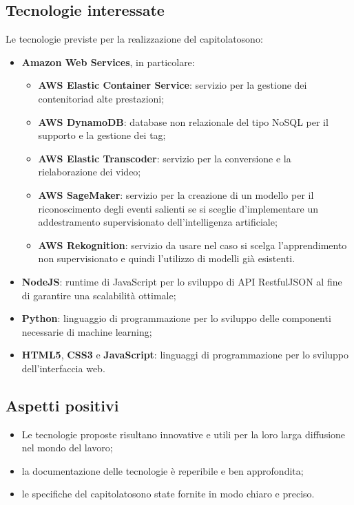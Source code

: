\subsection{Tecnologie interessate}
Le tecnologie previste per la realizzazione del capitolato\glosp sono:
\begin{itemize}
	\item \textbf{Amazon Web Services}\glo, in particolare:
	\begin{itemize}
		\item \textbf{AWS Elastic Container Service}: servizio per la gestione dei contenitori\glosp ad alte prestazioni;
		\item \textbf{AWS DynamoDB}: database non relazionale del tipo NoSQL per il supporto e la gestione dei tag;
		\item \textbf{AWS Elastic Transcoder}: servizio per la conversione e la rielaborazione dei video;
		\item \textbf{AWS SageMaker}: servizio per la creazione di un modello per il riconoscimento degli eventi salienti se si sceglie d'implementare un addestramento supervisionato dell'intelligenza artificiale\glo;
		\item \textbf{AWS Rekognition}: servizio da usare nel caso si scelga l'apprendimento non supervisionato e quindi l'utilizzo di modelli già esistenti.
	\end{itemize}
	\item \textbf{NodeJS}: runtime di JavaScript per lo sviluppo di API Restful\glosp JSON al fine di garantire una scalabilità ottimale;
	\item \textbf{Python}: linguaggio di programmazione per lo sviluppo delle componenti necessarie di machine learning\glo;
	\item \textbf{HTML5}, \textbf{CSS3} e \textbf{JavaScript}: linguaggi di programmazione per lo sviluppo dell'interfaccia web. 
\end{itemize}
\subsection{Aspetti positivi}
\begin{itemize}
	\item Le tecnologie proposte risultano innovative e utili per la loro larga diffusione nel mondo del lavoro;
	\item la documentazione delle tecnologie è reperibile e ben approfondita;
	\item le specifiche del capitolato\glosp sono state fornite in modo chiaro e preciso. 
\end{itemize}
